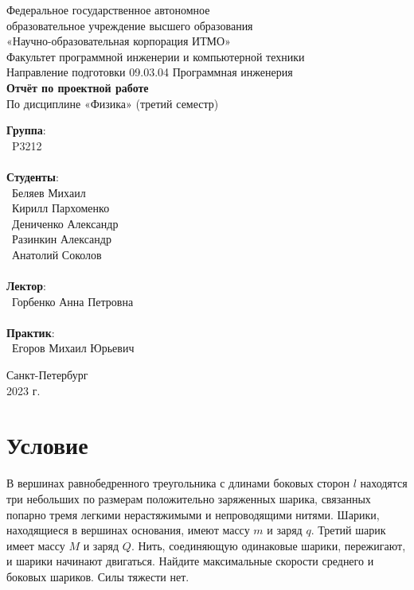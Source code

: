 \documentclass[landscape]{article}
\begin{document}
\begin{center}
    \Large
    Федеральное государственное автономное \\
    образовательное учреждение высшего образования \\ 
    «Научно-образовательная корпорация ИТМО»\\
    \vspace{0.5cm}
    \large
    Факультет программной инженерии и компьютерной техники \\
    Направление подготовки 09.03.04 Программная инженерия \\
    \vspace{1cm}
    \Large
    \textbf{Отчёт по проектной работе} \\
    По дисциплине «Физика» (третий семестр)\\
    \large
    \vspace{2cm}

    \begin{minipage}{.33\textwidth}
    \end{minipage}
    \hfill
    \begin{minipage}{.4\textwidth}
        \textbf{Группа}: \vspace{.1cm} \\
        \ P3212\\ \\
        \textbf{Студенты}: \vspace{.1cm} \\
        \ Беляев Михаил\\
        \ Кирилл Пархоменко\\
        \ Дениченко Александр\\
        \ Разинкин Александр\\
        \ Анатолий Соколов\\
        \\
        \textbf{Лектор}: \vspace{.1cm} \\
        \ Горбенко Анна Петровна \\ \\
        \textbf{Практик}:  \\
        \ Егоров Михаил Юрьевич
    \end{minipage}
    \vfill
Санкт-Петербург\\ 2023 г.
\end{center}

\newpage
\large
\section{Условие}
В вершинах равнобедренного треугольника с длинами боковых сторон $l$ находятся три небольших по размерам положительно заряженных шарика, связанных попарно тремя легкими нерастяжимыми и непроводящими нитями. Шарики, находящиеся в вершинах основания, имеют массу $m$ и заряд $q$. Третий шарик имеет массу $M $ и заряд $Q$. Нить, соединяющую одинаковые шарики, пережигают, и шарики начинают двигаться. Найдите максимальные скорости среднего и боковых шариков. Силы тяжести нет.
\end{document}
